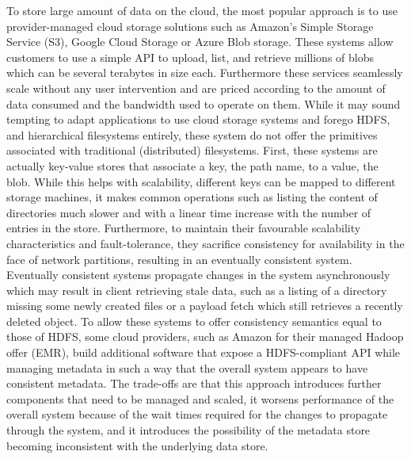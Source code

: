 To store large amount of data on the cloud, the most popular approach is to use provider-managed cloud storage solutions such as Amazon's Simple Storage Service (S3), Google Cloud Storage or Azure Blob storage.
These systems allow customers to use a simple API to upload, list, and retrieve millions of blobs which can be several terabytes in size each.
Furthermore these services seamlessly scale without any user intervention and are priced according to the amount of data consumed and the bandwidth used to operate on them.
While it may sound tempting to adapt applications to use cloud storage systems and forego HDFS, and hierarchical filesystems entirely, these system do not offer the primitives associated with traditional (distributed) filesystems.
First, these systems are actually key-value stores that associate a key, the path name, to a value, the blob.
While this helps with scalability, different keys can be mapped to different storage machines, it makes common operations such as listing the content of directories much slower and with a linear time increase with the number of entries in the store. 
Furthermore, to maintain their favourable scalability characteristics and fault-tolerance, they sacrifice consistency for availability in the face of network partitions, resulting in an eventually consistent system.
Eventually consistent systems propagate changes in the system asynchronously which may result in client retrieving stale data, such as a listing of a directory missing some newly created files or a payload fetch which still retrieves a recently deleted object.
To allow these systems to offer consistency semantics equal to those of HDFS, some cloud providers, such as Amazon for their managed Hadoop offer (EMR), build additional software that expose a HDFS-compliant API while managing metadata in such a way that the overall system appears to have consistent metadata.
The trade-offs are that this approach introduces further components that need to be managed and scaled, it worsens performance of the overall system because of the wait times required for the changes to propagate through the system, and it introduces the possibility of the metadata store becoming inconsistent with the underlying data store.

